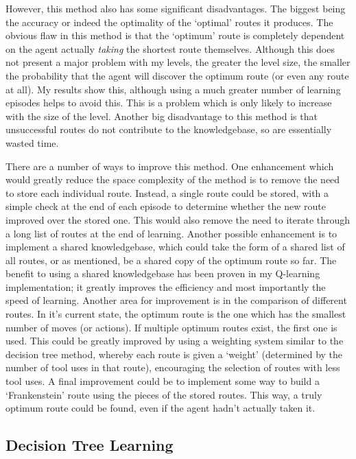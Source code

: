 \documentclass[a4paper,oneside]{report}
\begin{document}
However, this method also has some significant disadvantages. The biggest being the accuracy or indeed the optimality of the `optimal' routes it produces. The obvious flaw in this method is that the `optimum' route is completely dependent on the agent actually \emph{taking} the shortest route themselves. Although this does not present a major problem with my levels, the greater the level size, the smaller the probability that the agent will discover the optimum route (or even any route at all). My results show this, although using a much greater number of learning episodes helps to avoid this. This is a problem which is only likely to increase with the size of the level. Another big disadvantage to this method is that unsuccessful routes do not contribute to the knowledgebase, so are essentially wasted time. 

There are a number of ways to improve this method. One enhancement which would greatly reduce the space complexity of the method is to remove the need to store each individual route. Instead, a single route could be stored, with a simple check at the end of each episode to determine whether the new route improved over the stored one. This would also remove the need to iterate through a long list of routes at the end of learning. Another possible enhancement is to implement a shared knowledgebase, which could take the form of a shared list of all routes, or as mentioned, be a shared copy of the optimum route so far. The benefit to using a shared knowledgebase has been proven in my Q-learning implementation; it greatly improves the efficiency and most importantly the speed of learning. Another area for improvement is in the comparison of different routes. In it's current state, the optimum route is the one which has the smallest number of moves (or actions). If multiple optimum routes exist, the first one is used. This could be greatly improved by using a weighting system similar to the decision tree method, whereby each route is given a `weight' (determined by the number of tool uses in that route), encouraging the selection of routes with less tool uses. A final improvement could be to implement some way to build a `Frankenstein' route using the pieces of the stored routes. This way, a truly optimum route could be found, even if the agent hadn't actually taken it.

\subsection{Decision Tree Learning}
\end{document}

